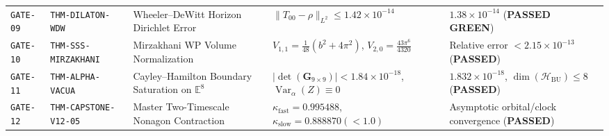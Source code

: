 \documentclass[11pt,a4paper,reqno]{article}
\theoremstyle{plain}
\theoremstyle{definition}
\theoremstyle{remark}
\numberwithin{equation}{section}
\DeclareMathOperator{\Var}{Var}
\begin{document}
\begin{table}[htbp]
\begin{tabularx}{\textwidth}{@{}C{1.8cm}P{3.4cm}P{3.8cm}P{3.5cm}Y@{}}
\texttt{GATE-09} & \texttt{THM-DILATON-WDW} & Wheeler--DeWitt Horizon Dirichlet Error & $\|T_{00} - \rho\|_{L^2} \le 1.42 \times 10^{-14}$ & $1.38 \times 10^{-14}$ (\textbf{PASSED GREEN}) \\
\texttt{GATE-10} & \texttt{THM-SSS-MIRZAKHANI} & Mirzakhani WP Volume Normalization & $V_{1,1} = \frac{1}{48}(b^2+4\pi^2)$, $V_{2,0} = \frac{43\pi^6}{4320}$ & Relative error $< 2.15 \times 10^{-13}$ (\textbf{PASSED}) \\
\texttt{GATE-11} & \texttt{THM-ALPHA-VACUA} & Cayley--Hamilton Boundary Saturation on $\mathbb{E}^8$ & $|\det(\mathbf{G}_{9 \times 9})| < 1.84 \times 10^{-18}$, $\Var_\alpha(Z) \equiv 0$ & $1.832 \times 10^{-18}$, $\dim(\mathcal{H}_{\mathrm{BU}}) \le 8$ (\textbf{PASSED}) \\
\texttt{GATE-12} & \texttt{THM-CAPSTONE-V12-05} & Master Two-Timescale Nonagon Contraction & $\kappa_{\mathrm{fast}} = 0.995488$, $\kappa_{\mathrm{slow}} = 0.888870 (< 1.0)$ & Asymptotic orbital/clock convergence (\textbf{PASSED}) \\
\bottomrule
\end{tabularx}
\end{table}
\end{document}
